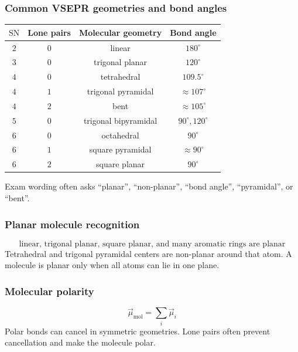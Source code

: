 \subsubsection{Common VSEPR geometries and bond angles}
\begin{tabular}{@{}cccc@{}}
\toprule
\(\mathrm{SN}\) & Lone pairs & Molecular geometry & Bond angle\\
\midrule
\(2\) & \(0\) & linear & \(180^\circ\)\\
\(3\) & \(0\) & trigonal planar & \(120^\circ\)\\
\(4\) & \(0\) & tetrahedral & \(109.5^\circ\)\\
\(4\) & \(1\) & trigonal pyramidal & \(\approx107^\circ\)\\
\(4\) & \(2\) & bent & \(\approx105^\circ\)\\
\(5\) & \(0\) & trigonal bipyramidal & \(90^\circ,120^\circ\)\\
\(6\) & \(0\) & octahedral & \(90^\circ\)\\
\(6\) & \(1\) & square pyramidal & \(\approx90^\circ\)\\
\(6\) & \(2\) & square planar & \(90^\circ\)\\
\bottomrule
\end{tabular}
Exam wording often asks ``planar'', ``non-planar'', ``bond angle'', ``pyramidal'', or ``bent''.

\subsubsection{Planar molecule recognition}
\begin{equation}
\label{eq:bonding:planarity-rule}
\text{linear, trigonal planar, square planar, and many aromatic rings are planar}
\end{equation}
Tetrahedral and trigonal pyramidal centers are non-planar around that atom. A molecule is planar only when all atoms can lie in one plane.

\subsubsection{Molecular polarity}
\begin{equation}
\label{eq:bonding:molecular-dipole}
\vec{\mu}_{\mathrm{mol}}=\sum_i\vec{\mu}_i
\end{equation}
Polar bonds can cancel in symmetric geometries. Lone pairs often prevent cancellation and make the molecule polar.

